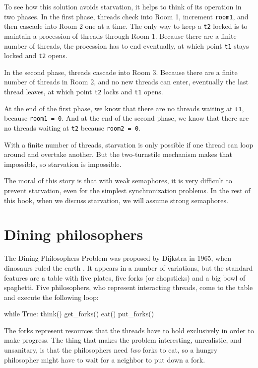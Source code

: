 \documentclass{book}
\begin{document}
To see how this solution avoids starvation, it helps to think of its
operation in two phases.  In the first phase, threads check into Room
1, increment {\tt room1}, and then cascade into Room 2 one at a time.
The only way to keep a {\tt t2} locked is to maintain a
procession of threads through Room 1.  Because there are a finite
number of threads, the procession has to end eventually, at which
point {\tt t1} stays locked and {\tt t2} opens.

In the second phase, threads cascade into Room 3.
Because there are a finite number of threads in Room 2, and
no new threads can enter, eventually the last thread leaves, at
which point {\tt t2} locks and {\tt t1} opens.

At the end of the first phase, we know that there are no threads
waiting at {\tt t1}, because {\tt room1 = 0}.  And at the end of the
second phase, we know that there are no threads waiting at {\tt t2}
because {\tt room2 = 0}.

With a finite number of threads, starvation is only possible if one
thread can loop around and overtake another.  But the two-turnstile
mechanism makes that impossible, so starvation is impossible.

The moral of this story is that with weak semaphores, it is very
difficult to prevent starvation, even for the simplest synchronization
problems.  In the rest of this book, when we discuss starvation, we
will assume strong semaphores.




\section{Dining philosophers}
\label{dining}

The Dining Philosophers Problem was proposed by Dijkstra in
1965, when dinosaurs ruled the earth \cite{dijkstra65}.  It
appears in a number of variations, but the standard features
are a table with five plates, five forks (or chopsticks) and
a big bowl of spaghetti.  Five philosophers, who represent
interacting threads, come to the table and execute the
following loop:


\begin{unbreakable}[title={Basic philosopher loop}]{}
while True:
   think()
   get_forks()
   eat()
   put_forks()
\end{unbreakable}

The forks represent resources that the threads have to hold
exclusively in order to make progress.  The thing that makes the
problem interesting, unrealistic, and unsanitary, is that the
philosophers need {\em two} forks to eat, so a hungry philosopher
might have to wait for a neighbor to put down a fork.
\end{document}

